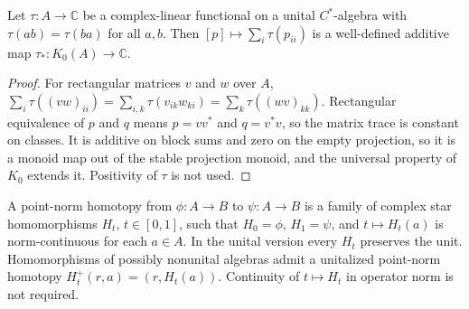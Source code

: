 \begin{proposition}\label{prop:tracial-functional-k0}
\leanok
Let $\tau:A\to\mathbb C$ be a complex-linear functional on a unital
$C^*$-algebra with $\tau(ab)=\tau(ba)$ for all $a,b$. Then
$[p]\mapsto\sum_i\tau(p_{ii})$ is a well-defined additive map
$\tau_*:K_0(A)\to\mathbb C$.
\end{proposition}
\begin{proof}
\leanok
For rectangular matrices $v$ and $w$ over $A$,
$\sum_i\tau((vw)_{ii})=\sum_{i,k}\tau(v_{ik}w_{ki})=\sum_k\tau((wv)_{kk})$.
Rectangular equivalence of $p$ and $q$ means $p=vv^*$ and $q=v^*v$, so the matrix
trace is constant on classes. It is additive on block sums and zero on the empty
projection, so it is a monoid map out of the stable projection monoid, and the
universal property of $K_0$ extends it. Positivity of $\tau$ is not used.
\end{proof}

\begin{definition}\label{def:star-homotopy}
\leanok
A point-norm homotopy from $\phi:A\to B$ to $\psi:A\to B$ is a family
of complex star homomorphisms $H_t$, $t\in[0,1]$, such that $H_0=\phi$,
$H_1=\psi$, and $t\mapsto H_t(a)$ is norm-continuous for each $a\in A$.
In the unital version every $H_t$ preserves the unit. Homomorphisms of
possibly nonunital algebras admit a unitalized point-norm homotopy
$H_t^+(r,a)=(r,H_t(a))$.
Continuity of $t\mapsto H_t$ in operator norm is not required.
\end{definition}

